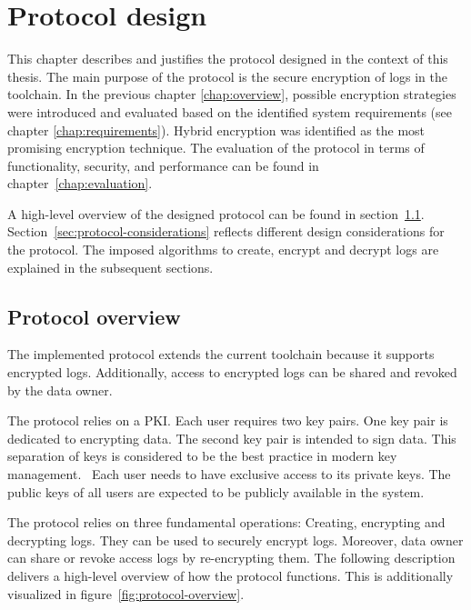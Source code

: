 \documentclass[../main.tex]{subfiles}
\begin{document}
\chapter{Protocol design}
\label{chap:design}

This chapter describes and justifies the protocol designed in the context of this thesis.
The main purpose of the protocol is the secure encryption of logs in the toolchain.
In the previous chapter \ref{chap:overview}, possible encryption strategies were introduced and evaluated based on the identified system requirements (see chapter \ref{chap:requirements}).
Hybrid encryption was identified as the most promising encryption technique.
The evaluation of the protocol in terms of functionality, security, and performance can be found in chapter~\ref{chap:evaluation}.

A high-level overview of the designed protocol can be found in section~\ref{sec:overview}.
Section~\ref{sec:protocol-considerations} reflects different design considerations for the protocol.
The imposed algorithms to create, encrypt and decrypt logs are explained in the subsequent sections. 

\section{Protocol overview}
\label{sec:overview}

The implemented protocol extends the current toolchain because it supports encrypted logs.
Additionally, access to encrypted logs can be shared and revoked by the data owner.

The protocol relies on a PKI.
Each user requires two key pairs.
One key pair is dedicated to encrypting data.
The second key pair is intended to sign data.
This separation of keys is considered to be the best practice in modern key management.~
Each user needs to have exclusive access to its private keys.
The public keys of all users are expected to be publicly available in the system.

The protocol relies on three fundamental operations: 
Creating, encrypting and decrypting logs.
They can be used to securely encrypt logs.
Moreover, data owner can share or revoke access logs by re-encrypting them.
The following description delivers a high-level overview of how the protocol functions.
This is additionally visualized in figure~\ref{fig:protocol-overview}.
\end{document}
